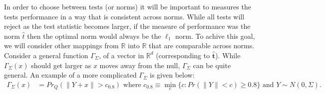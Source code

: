 \documentclass{article}
\newcommand{\tst}{\hat{\boldsymbol{t}}}
\newcommand{\rvt}{Y}
\newcommand{\distv}{Q}
\newcommand{\Gammaf}{\Gamma_{\Sigma}}
\begin{document}
In order to choose between tests (or norms) it will be important to measures the tests performance in a way that is consistent across norms.  While all tests will reject as the test statistic becomes larger, if the measure of performance was the norm $\hat{t}$ then the optimal norm would always be the $\ell_1$ norm.  To achive this goal, we will consider other mappings from $\mathbb{R}$ into $\mathbb{R}$ that are comparable across norms.  Consider a general function $\Gammaf$, of a vector in $\mathbb{R}^d$ (corresponding to $\tst$). While $\Gammaf(x)$ should get larger as $x$ moves away from the null, $\Gammaf$ can be quite general.
An example of a more complicated $\Gammaf$ is given below:
\begin{align}
	\Gammaf(x) &= Pr_\distv(\|\rvt + x\| > c_{0.8})  \text{ where }  c_{0.8} \equiv \min_{c}\{c : Pr(\|\rvt\| < c) \geq 0.8 \} \text{ and } \rvt \sim N(0, \Sigma). \label{gamma:pow}
\end{align}


\end{document}
